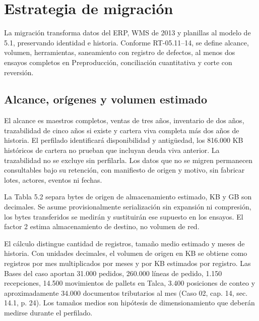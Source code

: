 \section{Estrategia de migración}
\label{sec:sd5-5-3}

La migración transforma datos del ERP, WMS de 2013 y planillas al modelo de 5.1, preservando identidad e historia. Conforme RT-05.11–14, se define alcance, volumen, herramientas, saneamiento con registro de defectos, al menos dos ensayos completos en Preproducción, conciliación cuantitativa y corte con reversión.

\subsection{Alcance, orígenes y volumen estimado}
\label{sec:sd5-5-3-1}

El alcance es maestros completos, ventas de tres años, inventario de dos años, trazabilidad de cinco años si existe y cartera viva completa más dos años de historia. El perfilado identificará disponibilidad y antigüedad, los 816.000 KB históricos de cartera no prueban que incluyan deuda viva anterior. La trazabilidad no se excluye sin perfilarla. Los datos que no se migren permanecen consultables bajo su retención, con manifiesto de origen y motivo, sin fabricar lotes, actores, eventos ni fechas.

La Tabla 5.2 separa bytes de origen de almacenamiento estimado, KB y GB son decimales. Se asume provisionalmente serialización sin expansión ni compresión, los bytes transferidos se medirán y sustituirán ese supuesto en los ensayos. El factor 2 estima almacenamiento de destino, no volumen de red.



El cálculo distingue cantidad de registros, tamaño medio estimado y meses de historia. Con unidades decimales, el volumen de origen en KB se obtiene como registros por mes multiplicados por meses y por KB estimados por registro. Las Bases del caso aportan 31.000 pedidos, 260.000 líneas de pedido, 1.150 recepciones, 14.500 movimientos de pallets en Talca, 3.400 posiciones de conteo y aproximadamente 34.000 documentos tributarios al mes (Caso 02, cap. 14, sec. 14.1, p. 24). Los tamaños medios son hipótesis de dimensionamiento que deberán medirse durante el perfilado.

